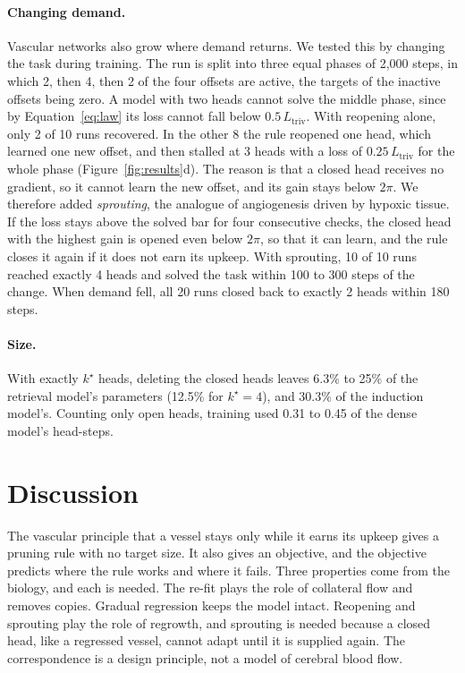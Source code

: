 \documentclass[letterpaper]{article} %
\newcommand{\Ltriv}{L_{\mathrm{triv}}}
\newcommand{\kstar}{k^\star}
\begin{document}
\paragraph{Changing demand.} Vascular networks also grow where demand returns. We tested this by changing the task during training. The run is split into three equal phases of 2{,}000 steps, in which 2, then 4, then 2 of the four offsets are active, the targets of the inactive offsets being zero. A model with two heads cannot solve the middle phase, since by Equation~\eqref{eq:law} its loss cannot fall below $0.5\,\Ltriv$. With reopening alone, only 2 of 10 runs recovered. In the other 8 the rule reopened one head, which learned one new offset, and then stalled at 3 heads with a loss of $0.25\,\Ltriv$ for the whole phase (Figure~\ref{fig:results}d). The reason is that a closed head receives no gradient, so it cannot learn the new offset, and its gain stays below $2\pi$. We therefore added \emph{sprouting}, the analogue of angiogenesis driven by hypoxic tissue. If the loss stays above the solved bar for four consecutive checks, the closed head with the highest gain is opened even below $2\pi$, so that it can learn, and the rule closes it again if it does not earn its upkeep. With sprouting, 10 of 10 runs reached exactly 4 heads and solved the task within 100 to 300 steps of the change. When demand fell, all 20 runs closed back to exactly 2 heads within 180 steps.

\paragraph{Size.} With exactly $\kstar$ heads, deleting the closed heads leaves 6.3\% to 25\% of the retrieval model's parameters (12.5\% for $\kstar=4$), and 30.3\% of the induction model's. Counting only open heads, training used 0.31 to 0.45 of the dense model's head-steps.

\section{Discussion}

The vascular principle that a vessel stays only while it earns its upkeep gives a pruning rule with no target size. It also gives an objective, and the objective predicts where the rule works and where it fails. Three properties come from the biology, and each is needed. The re-fit plays the role of collateral flow and removes copies. Gradual regression keeps the model intact. Reopening and sprouting play the role of regrowth, and sprouting is needed because a closed head, like a regressed vessel, cannot adapt until it is supplied again. The correspondence is a design principle, not a model of cerebral blood flow.
\end{document}
